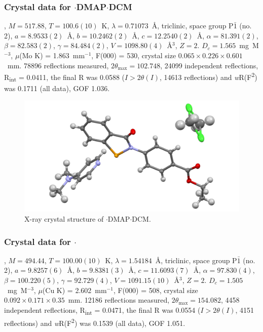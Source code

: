 \begin{refsection}
\subsubsection{Crystal data for \texorpdfstring{$ \cdot $DMAP$ \cdot $DCM}{C24 H25 Cl N3 O3 Se}}
, $M=517.88$, $T=100.6(10)$~K, $ \lambda=0.71073 $~\AA, triclinic, space group P$\bar{1}$ (no. 2), $a = 8.9533(2)$~\AA, $b = 10.2462(2)$~\AA, $c = 12.2540(2)$~\AA, $\alpha = 81.391(2)$\degree, $\beta = 82.583(2)$\degree, $\gamma = 84.484(2)$\degree, $V = 1098.80(4)$~\AA$^{3}$, $Z = 2$. $D_{c}= 1.565$~mg~M$^{-3}$, $\mu$(Mo K\a) = 1.863~mm$^{-1}$, F(000) = 530, crystal size $0.065 \times 0.226 \times 0.601$~mm. 78896 reflections measured, $2\theta_{\max}=102.748$\degree, 24099 independent reflections, R\textsubscript{int} = 0.0411, the final R was 0.0588 ($I > 2\theta(I)$, 14613 reflections) and \textit{w}R(F\textsuperscript{2}) was 0.1711 (all data), GOF 1.036.

\begin{figure}
  \includegraphics[width=0.6\linewidth]{Figures/ebs-4co2et-dmap-dcm-xtal.pdf}
  \caption{X-ray crystal structure of \texorpdfstring{$ \cdot $DMAP$ \cdot $DCM}{C24 H25 Cl N3 O3 Se}.}
\end{figure}

\subsubsection{Crystal data for \texorpdfstring{$ \cdot $}{C25 H25 N3 O3 Se}}
, $M=494.44$, $T=100.00(10)$~K, $\lambda=1.54184$~\AA, triclinic, space group P$\bar{1}$ (no. 2), $a = 9.8257(6)$~\AA, $b = 9.8381(3)$~\AA, $c = 11.6093(7)$~\AA, $\alpha = 97.830(4)$\degree, $\beta = 100.220(5)$\degree, $\gamma = 92.729(4)$\degree, $V = 1091.15(10)$~\AA$^{3}$, $Z = 2$. $D_{c}= 1.505$~mg~M$^{-3}$, $\mu$(Cu K\a) = 2.602~mm$^{-1}$, F(000) = 508, crystal size $0.092 \times 0.171 \times 0.35$~mm. 12186 reflections measured, $2\theta_{\max}=154.082$\degree, 4458 independent reflections, R\textsubscript{int} = 0.0471, the final R was 0.0554 ($I > 2\theta(I)$, 4151 reflections) and \textit{w}R(F\textsuperscript{2}) was 0.1539 (all data), GOF 1.051.


\end{refsection}
